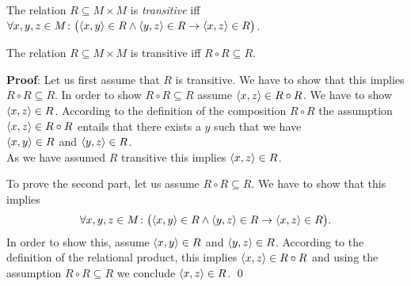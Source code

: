 \begin{Definition}
The  relation $R \subseteq M \times M$  is \emph{transitive} iff \\[0.2cm]
\hspace*{1.3cm} 
$\forall x, y, z \in M \colon 
 \bigl(\pair(x,y) \in R \wedge \pair(y,z) \in R \rightarrow \pair(x,z) \in R\bigr)$.
\end{Definition}

\begin{Proposition}
The relation $R \subseteq M \times M$  is transitive iff $R \circ R \subseteq R$.
\end{Proposition}

\noindent
\textbf{Proof}:  Let us first assume that $R$ is transitive.  We have to show that this
implies $R \circ R \subseteq R$.  
In order to show $R \circ R \subseteq R$ assume $\pair(x,z) \in R \circ R$.  We have
to show $\pair(x,z) \in R$.  According to the definition of the composition $R \circ R$
the assumption $\pair(x,z) \in R \circ R$ entails that there exists a $y$ such that we
have 
\\[0.2cm]
\hspace*{1.3cm}
$\pair(x,y) \in R$ \quad and \quad $\pair(y,z) \in R$.
\\[0.2cm]
As we have assumed $R$ transitive this implies  $\pair(x,z) \in R$.

To prove the second part, let us assume $R \circ R \subseteq R$.  We have to show that this
implies
\[ \forall x, y, z \in M \colon 
   \bigl(\pair(x,y) \in R \wedge \pair(y,z) \in R \rightarrow \pair(x,z) \in R\bigr). 
\]
In order to show this, assume  $\pair(x,y) \in R$ and $\pair(y,z) \in R$.
According to the definition of the relational product,
this implies  $\pair(x,z) \in R \circ R$ and using the assumption $R \circ R \subseteq R$
we  conclude  $\pair(x,z) \in R$. \qed
\vspace*{0.2cm}



